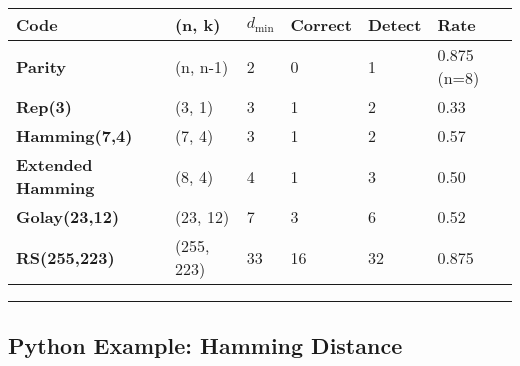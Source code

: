 {\def\LTcaptype{} %
\begin{longtable}[]{@{}llllll@{}}
\toprule\noalign{}
Code & (n, k) & \(d_{\min}\) & Correct & Detect & Rate \\
\midrule\noalign{}
\endhead
\bottomrule\noalign{}
\endlastfoot
\textbf{Parity} & (n, n-1) & 2 & 0 & 1 & 0.875 (n=8) \\
\textbf{Rep(3)} & (3, 1) & 3 & 1 & 2 & 0.33 \\
\textbf{Hamming(7,4)} & (7, 4) & 3 & 1 & 2 & 0.57 \\
\textbf{Extended Hamming} & (8, 4) & 4 & 1 & 3 & 0.50 \\
\textbf{Golay(23,12)} & (23, 12) & 7 & 3 & 6 & 0.52 \\
\textbf{RS(255,223)} & (255, 223) & 33 & 16 & 32 & 0.875 \\
\end{longtable}
}

\begin{center}\rule{0.5\linewidth}{0.5pt}\end{center}

\subsection{Python Example: Hamming
Distance}\label{python-example-hamming-distance}

